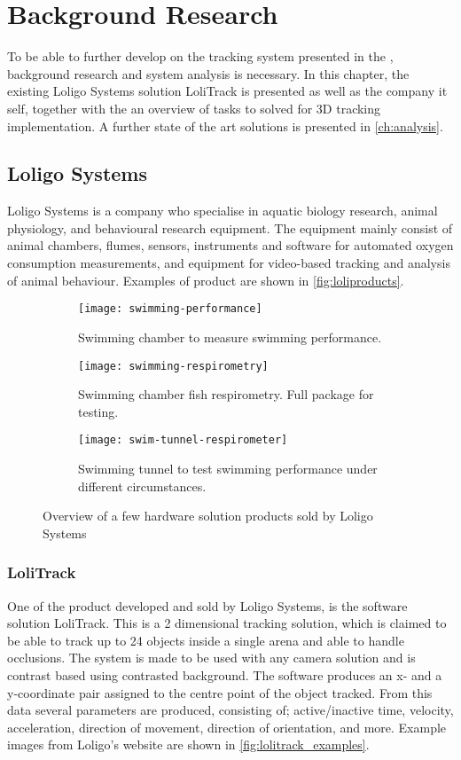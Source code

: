 \graphicspath{{figures/research/}}
\chapter{Background Research}\glsresetall
\label{cha:research}
To be able to further develop on the tracking system presented in the , background research and system analysis is necessary. In this chapter, the existing Loligo Systems solution LoliTrack is presented as well as the company it self, together with the an overview of tasks to solved for 3D tracking implementation. A further state of the art solutions is presented in \autoref{ch:analysis}.

\section{Loligo Systems}\label{sec:loligo_res}
Loligo Systems is a company who specialise in aquatic biology research, animal physiology, and  behavioural research equipment. The equipment mainly consist of animal chambers, flumes, sensors, instruments and software for automated oxygen consumption measurements, and equipment for video-based tracking and analysis of animal behaviour. Examples of product are shown in \autoref{fig:loliproducts}.

\begin{figure}[H]
	\centering
	\begin{subfigure}{0.33\textwidth}
		\texttt{[image: swimming-performance]}
		\caption{Swimming chamber to measure swimming performance.}
	\end{subfigure}
	\begin{subfigure}{0.33\textwidth}
		\texttt{[image: swimming-respirometry]}
		\caption{Swimming chamber fish respirometry. Full package for testing.}
	\end{subfigure}
	\begin{subfigure}{0.32\textwidth}
		\texttt{[image: swim-tunnel-respirometer]}
		\caption{Swimming tunnel to test swimming performance under different circumstances.}
	\end{subfigure}
\caption{Overview of a few hardware solution products sold by Loligo Systems}
\label{fig:loliproducts}
\end{figure}

\subsection{LoliTrack}
One of the product developed and sold by Loligo Systems, is the software solution LoliTrack. This is a 2 dimensional tracking solution, which is claimed to be able to track up to 24 objects inside a single arena and able to handle occlusions. The system is made to be used with any camera solution and is contrast based using contrasted background. The software produces an x- and a y-coordinate pair assigned to the centre point of the object tracked. From this data several parameters are produced, consisting of; active/inactive time, velocity, acceleration, direction of movement, direction of orientation, and more. Example images from Loligo's website are shown in \autoref{fig:lolitrack_examples}.

